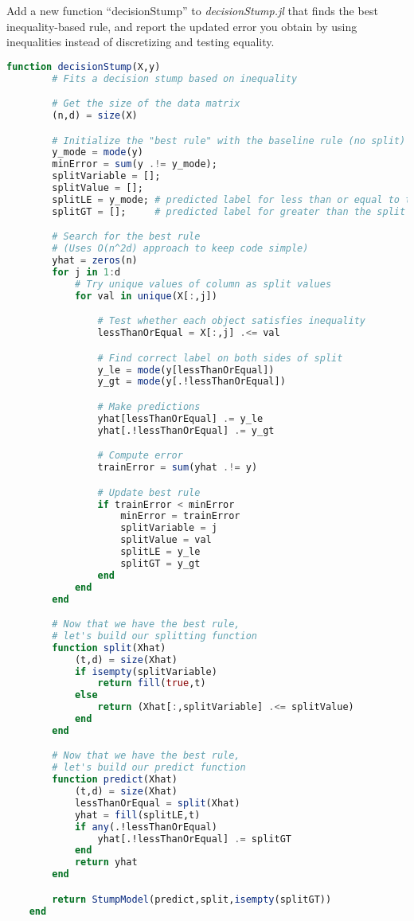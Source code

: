 \documentclass{article}
\def\blu#1{{\color{blu}#1}}
\begin{document}
\blu{Add a new function ``decisionStump'' to \emph{decisionStump.jl} that finds the best inequality-based rule, and report the updated error you obtain by using inequalities instead of discretizing and testing equality.}

\begin{lstlisting}[language=julia]
	function decisionStump(X,y)
		# Fits a decision stump based on inequality

		# Get the size of the data matrix
		(n,d) = size(X)

		# Initialize the "best rule" with the baseline rule (no split)
		y_mode = mode(y)
		minError = sum(y .!= y_mode);
		splitVariable = [];
		splitValue = [];
		splitLE = y_mode; # predicted label for less than or equal to the split value
		splitGT = [];     # predicted label for greater than the split value

		# Search for the best rule
		# (Uses O(n^2d) approach to keep code simple)
		yhat = zeros(n)
		for j in 1:d
			# Try unique values of column as split values
			for val in unique(X[:,j])

				# Test whether each object satisfies inequality
				lessThanOrEqual = X[:,j] .<= val

				# Find correct label on both sides of split
				y_le = mode(y[lessThanOrEqual])
				y_gt = mode(y[.!lessThanOrEqual])

				# Make predictions
				yhat[lessThanOrEqual] .= y_le
				yhat[.!lessThanOrEqual] .= y_gt

				# Compute error
				trainError = sum(yhat .!= y)

				# Update best rule
				if trainError < minError
					minError = trainError
					splitVariable = j
					splitValue = val
					splitLE = y_le
					splitGT = y_gt
				end
			end
		end

		# Now that we have the best rule,
		# let's build our splitting function
		function split(Xhat)
			(t,d) = size(Xhat)
			if isempty(splitVariable)
				return fill(true,t)
			else
				return (Xhat[:,splitVariable] .<= splitValue)
			end
		end

		# Now that we have the best rule,
		# let's build our predict function
		function predict(Xhat)
			(t,d) = size(Xhat)
			lessThanOrEqual = split(Xhat)
			yhat = fill(splitLE,t)
			if any(.!lessThanOrEqual)
				yhat[.!lessThanOrEqual] .= splitGT
			end
			return yhat
		end

		return StumpModel(predict,split,isempty(splitGT))
	end
\end{lstlisting}
\end{document}
